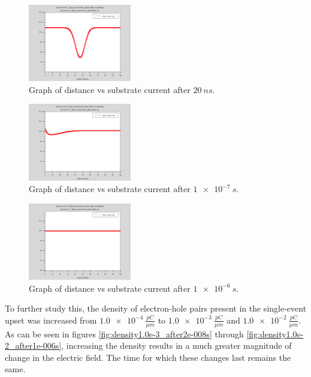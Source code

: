 \documentclass[12pt]{article}
\begin{document}
\begin{figure}[H]
  \centering
  \includegraphics[width=0.4\textwidth]{PC_100um_Nsub1e+015_after2e-008s}
  \caption{Graph of distance vs substrate current after $\SI{20}{ns}$.}
  \label{fig:after2e-008s}
\end{figure}
\begin{figure}[H]
  \centering
  \includegraphics[width=0.4\textwidth]{PC_100um_Nsub1e+015_after1e-007s}
  \caption{Graph of distance vs substrate current after $\SI{1e-7}{s}$.}
  \label{fig:after1e-007s}
\end{figure}
\begin{figure}[H]
  \centering
  \includegraphics[width=0.4\textwidth]{PC_100um_Nsub1e+015_after1e-006s}
  \caption{Graph of distance vs substrate current after $\SI{1e-6}{s}$.}
  \label{fig:after1e-006s}
\end{figure}

To further study this, the density of electron-hole pairs present in the single-event upset was increased from $\SI{1.0e-4}{\frac{pC}{{\mu}m}}$ to $\SI{1.0e-3}{\frac{pC}{{\mu}m}}$ and $\SI{1.0e-2}{\frac{pC}{{\mu}m}}$. As can be seen in figures \ref{fig:density1.0e-3_after2e-008s} through \ref{fig:density1.0e-2_after1e-006s}, increasing the density results in a much greater magnitude of change in the electric field. The time for which these changes last remains the same.
\end{document}
